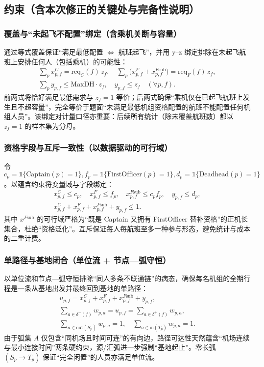 \documentclass{article}
\begin{document}
\subsection{约束（含本次修正的关键处与完备性说明）}

\subsubsection{覆盖与“未起飞不配置”绑定（含乘机关断与容量）}
通过等式覆盖保证“满足最低配置 $\Leftrightarrow$ 航班起飞”，并用 y–z 绑定排除在未起飞航班上安排任何人（包括乘机）的可能性：
\begin{gather}
\sum_{p} x^{C}_{p,f} = \mathrm{req}_C(f)\,z_f, \quad
\sum_{p}\big(x^{F}_{p,f}+x^{F\text{sub}}_{p,f}\big) = \mathrm{req}_F(f)\,z_f, \\
\sum_{p} y_{p,f} \le \mathrm{MaxDH} \cdot z_f, \quad
y_{p,f} \le z_f \quad (\forall p,f).
\end{gather}
前两式将恰好满足最低需求与 $z_f=1$ 等价；后两式确保“乘机仅在已起飞航班上发生且不超容量”，完全等价于题面“未满足最低机组资格配置的航班不能配置任何机组人员”。该绑定对计量口径亦重要：后续所有统计（除未覆盖航班数）都以 $z_f=1$ 的样本集为分母。

\subsubsection{资格字段与互斥一致性（以数据驱动的可行域）}
令 $c_p=\mathbb{1}\{\mathrm{Captain}(p)=1\}, f_p=\mathbb{1}\{\mathrm{FirstOfficer}(p)=1\}, d_p=\mathbb{1}\{\mathrm{Deadhead}(p)=1\}$。以蕴含约束将变量域与字段绑定：
\begin{gather}
x^{C}_{p,f}\le c_p, \quad 
x^{F}_{p,f}\le f_p, \quad 
x^{F\text{sub}}_{p,f}\le c_p f_p, \quad 
y_{p,f}\le d_p, \\
x^{C}_{p,f}+x^{F}_{p,f}+x^{F\text{sub}}_{p,f}+y_{p,f}\le 1.
\end{gather}
其中 $x^{F\text{sub}}$ 的可行域严格为“既是 Captain 又拥有 FirstOfficer 替补资格”的正机长集合，杜绝“资格泛化”。互斥保证每人每航班至多一种参与形态，避免统计与成本的二重计费。

\subsubsection{单路径与基地闭合（单位流 + 节点—弧守恒）}
以单位流和节点—弧守恒排除“同人多条不联通链”的病态，确保每名机组的全期行程是一条从基地出发并最终回到基地的单路径：
\begin{gather}
u_{p,f}=x^{C}_{p,f}+x^{F}_{p,f}+x^{F\text{sub}}_{p,f}+y_{p,f}, \\
\sum_{a\in \delta^{-}(f)} w_{p,a}=u_{p,f}=\sum_{a\in \delta^{+}(f)} w_{p,a}, \\
\sum_{a\in \mathrm{out}(S_p)} w_{p,a}=1, \quad 
\sum_{a\in \mathrm{in}(T_p)} w_{p,a}=1.
\end{gather}
由于弧集 $A$ 仅包含“同机场且时间可连”的有向边，路径可达性天然蕴含“机场连续与最小连接时间”两条硬约束，源/汇弧进一步强制“基地起止”。零长弧 $(S_p \to T_p)$ 保证“完全闲置”的人员亦满足单位流。
\end{document}
